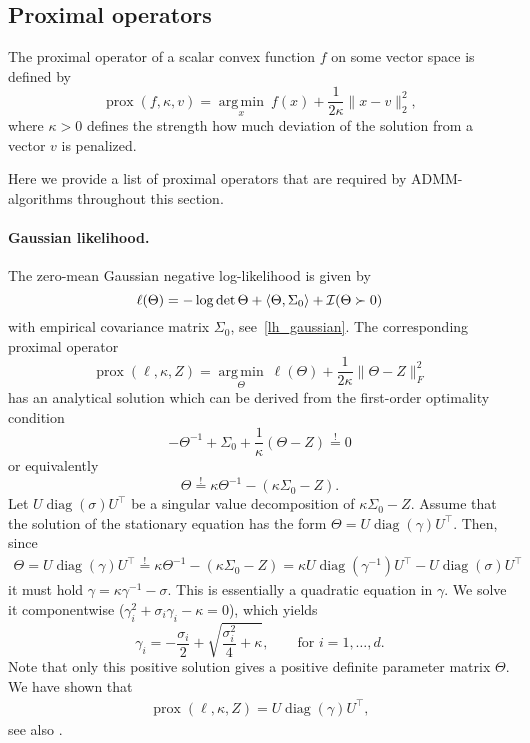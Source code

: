 \documentclass{article}
\newcommand{\scalp}[1]{ \left\langle #1\right\rangle} %
\DeclareMathOperator{\diag}{diag}
\DeclareMathOperator{\logdet}{log\,det}
\DeclareMathOperator{\argmin}{arg\,min}
\DeclareMathOperator{\prox}{prox}
\begin{document}
\subsection{Proximal operators}
The proximal operator of a scalar convex function $f$ on some vector space is defined by
\[\prox(f, \kappa, v) = \underset{x}{\argmin} \: f(x) + \frac{1}{2\kappa}\|x-v\|_2^2,\]
where $\kappa>0$ defines the strength how much deviation of the solution from a vector $v$ is penalized.


Here we provide a list of proximal operators that are required by ADMM-algorithms throughout this section.

\paragraph{Gaussian likelihood.}
The zero-mean Gaussian negative log-likelihood is given by
\[\ell(\Theta) = -\logdet \Theta + \scalp{\Theta, \Sigma_0} + \I( \Theta\succ0)\]
with empirical covariance matrix $\Sigma_0$, see~\eqref{lh_gaussian}.
The corresponding proximal operator
\[\prox(\ell, \kappa, Z) = \underset{\Theta}{\argmin} \: \ell(\Theta) + \frac{1}{2\kappa}\|\Theta-Z\|_F^2\]
has an analytical solution which can be derived from the first-order optimality condition
\[-\Theta^{-1} + \Sigma_0 + \frac{1}{\kappa}(\Theta -Z) \stackrel{!}{=} 0\]
or equivalently
\[\Theta \stackrel{!}{=}\kappa \Theta^{-1} - (\kappa \Sigma_0 - Z)  .\]
Let $U \diag(\sigma) U^\top$ be a singular value decomposition of $\kappa \Sigma_0 - Z$.
Assume that the solution of the stationary equation has the form  $\Theta = U\diag(\gamma) U^\top$.
Then, since
\begin{align*}
\Theta= U\diag(\gamma) U^\top \stackrel{!}{=}\kappa \Theta^{-1} - (\kappa \Sigma_0 - Z)
 = \kappa U\diag(\gamma^{-1}) U^\top - U \diag(\sigma) U^\top 
\end{align*}
it must hold $\gamma = \kappa \gamma^{-1} - \sigma $.
This is essentially a quadratic equation in $\gamma$. We solve it componentwise ($\gamma_i^2 + \sigma_i \gamma_i - \kappa=0$), which yields
\[\gamma_i = -\frac{\sigma_i}{2} + \sqrt{\frac{\sigma_i^2}{4}+\kappa},\qquad \text{for }i=1,\ldots, d.\]
Note that only this positive solution gives a positive definite parameter matrix $\Theta$. We have shown that
\begin{align}
\prox(\ell, \kappa, Z) = U\diag(\gamma) U^\top, \tag{Prox-GLH}\label{prox_glh}
\end{align}
see also \cite{ma2013alternating}.
\end{document}
